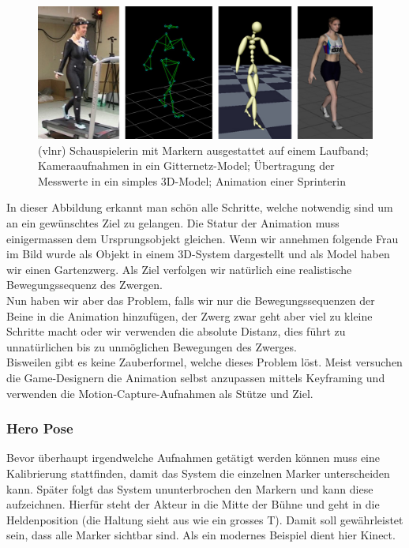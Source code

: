 \begin{figure}[htbp]
\centering
\includegraphics[scale=0.6]{include/opt_mocap.jpg}
\caption{(vlnr) Schauspielerin mit Markern ausgestattet auf einem Laufband; Kameraaufnahmen in ein Gitternetz-Model; Übertragung der Messwerte in ein simples 3D-Model; Animation einer Sprinterin}
\end{figure}

In dieser Abbildung erkannt man schön alle Schritte, welche notwendig sind um an ein gewünschtes Ziel zu gelangen. Die Statur der Animation muss einigermassen dem Ursprungsobjekt gleichen. Wenn wir annehmen folgende Frau im Bild wurde als Objekt in einem 3D-System dargestellt und als Model haben wir einen Gartenzwerg. Als Ziel verfolgen wir natürlich eine realistische Bewegungssequenz des Zwergen. \\
Nun haben wir aber das Problem, falls wir nur die Bewegungssequenzen der Beine in die Animation hinzufügen, der Zwerg zwar geht aber viel zu kleine Schritte macht oder wir verwenden die absolute Distanz, dies führt zu unnatürlichen bis zu unmöglichen Bewegungen des Zwerges. \\
Bisweilen gibt es keine Zauberformel, welche dieses Problem löst. Meist versuchen die Game-Designern die Animation selbst anzupassen mittels Keyframing und verwenden die Motion-Capture-Aufnahmen als Stütze und Ziel.

\subsubsection{Hero Pose}
Bevor überhaupt irgendwelche Aufnahmen getätigt werden können muss eine Kalibrierung stattfinden, damit das System die einzelnen Marker unterscheiden kann. Später folgt das System ununterbrochen den Markern und kann diese aufzeichnen. Hierfür steht der Akteur in die Mitte der Bühne und geht in die Heldenposition (die Haltung sieht aus wie ein grosses T). Damit soll gewährleistet sein, dass alle Marker sichtbar sind. Als ein modernes Beispiel dient hier Kinect.
 
